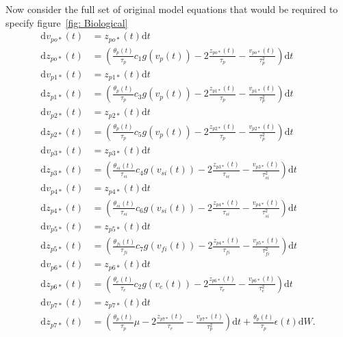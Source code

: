 Now consider the full set of original model equations that would be required to specify figure~\ref{fig: Biological}
\begin{align}
\label{eqn: Fullmodel Descrip}
\mathrm{d}v_{po*}(t)&= z_{po*}(t)\mathrm{d}t\\
\mathrm{d}z_{po*}(t)&=\left(\frac{\theta_{p}(t)}{\tau_{p}}c_{1}g(v_{p}(t))-2\frac{z_{po*}(t)}{\tau_{p}}-\frac{v_{po*}(t)}{\tau_{p}^{2}}\right)\mathrm{d}t\\
\mathrm{d}v_{p1*}(t)&= z_{p1*}(t)\mathrm{d}t\\
\mathrm{d}z_{p1*}(t)&=\left(\frac{\theta_{p}(t)}{\tau_{p}}c_{3}g(v_{p}(t))-2\frac{z_{p1*}(t)}{\tau_{p}}-\frac{v_{p1*}(t)}{\tau_{p}^{2}}\right)\mathrm{d}t\\
\mathrm{d}v_{p2*}(t)&= z_{p2*}(t)\mathrm{d}t\\
\label{eqn: Pyr}
\mathrm{d}z_{p2*}(t)&=\left(\frac{\theta_{p}(t)}{\tau_{p}}c_{5}g(v_{p}(t))-2\frac{z_{p2*}(t)}{\tau_{p}}-\frac{v_{p2*}(t)}{\tau_{p}^{2}}\right)\mathrm{d}t\\
\label{eqn: SI}
\mathrm{d}v_{p3*}(t)&= z_{p3*}(t)\mathrm{d}t\\
\mathrm{d}z_{p3*}(t)&=\left(\frac{\theta_{si}(t)}{\tau_{si}}c_{4}g(v_{si}(t))-2\frac{z_{p3*}(t)}{\tau_{si}}-\frac{v_{p3*}(t)}{\tau_{si}^{2}}\right)\mathrm{d}t\\
\mathrm{d}v_{p4*}(t)&= z_{p4*}(t)\mathrm{d}t\\
\label{eqn: SI1}
\mathrm{d}z_{p4*}(t)&=\left(\frac{\theta_{si}(t)}{\tau_{si}}c_{6}g(v_{si}(t))-2\frac{z_{p4*}(t)}{\tau_{si}}-\frac{v_{p4*}(t)}{\tau_{si}^{2}}\right)\mathrm{d}t\\
\label{eqn: FI}
\mathrm{d}v_{p5*}(t)&= z_{p5*}(t)\mathrm{d}t\\
\label{eqn: FI2}
\mathrm{d}z_{p5*}(t)&=\left(\frac{\theta_{fi}(t)}{\tau_{fi}}c_{7}g(v_{fi}(t))-2\frac{z_{p4*}(t)}{\tau_{fi}}-\frac{v_{p5*}(t)}{\tau_{fi}^{2}}\right)\mathrm{d}t\\
\label{eqn: Exc}
\mathrm{d}v_{p6*}(t)&= z_{p6*}(t)\mathrm{d}t\\
\mathrm{d}z_{p6*}(t)&=\left(\frac{\theta_{e}(t)}{\tau_{e}}c_{2}g(v_{e}(t))-2\frac{z_{p6*}(t)}{\tau_{e}}-\frac{v_{p6*}(t)}{\tau_{e}^{2}}\right)\mathrm{d}t\\
\mathrm{d}v_{p7*}(t)&= z_{p7*}(t)\mathrm{d}t\\
\label{eqn: WienerFull}
\mathrm{d}z_{p7*}(t)&=\left(\frac{\theta_{p}(t)}{\tau_{p}}\mu -2\frac{z_{p7*}(t)}{\tau_{e}}-\frac{v_{p7*}(t)}{\tau_{p}^{2}}\right)\mathrm{d}t + \frac{\theta_{p}(t)}{\tau_{p}}\epsilon(t)\mathrm{d}W.\\

\end{align}
